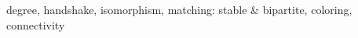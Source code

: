 \documentclass[quiz]{mcs}
\begin{document}


\begin{staffnotes}
degree, handshake, isomorphism, matching: stable \& bipartite,
coloring, connectivity
\end{staffnotes}



{}


\examspace
{}



\end{document}
